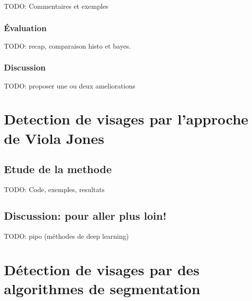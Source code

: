 \documentclass{article}
\begin{document}
\begin{table}[h!]
\centering
{}
\caption{Résultats avec la méthode de Bayes (HSV, seuil 0.15)}
\label{bayes-hsv}
\end{table}

TODO: Commentaires et exemples

\subsubsection{Évaluation}

TODO: recap, comparaison histo et bayes. 

\subsubsection{Discussion}

TODO: proposer une ou deux ameliorations

\section{Detection de visages par l'approche de Viola Jones}
\subsection{Etude de la methode}
TODO: Code, exemples, resultats

\subsection{Discussion: pour aller plus loin!}
TODO: pipo (méthodes de deep learning)

\section{Détection de visages par des algorithmes de segmentation}
\end{document}
